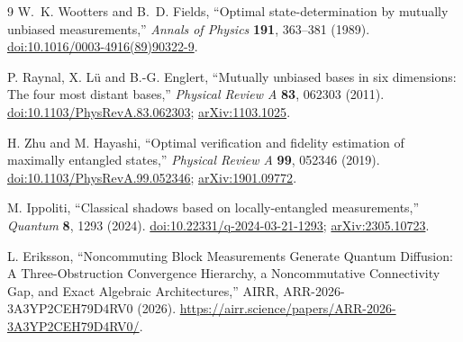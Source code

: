 \documentclass[11pt,a4paper]{article}
\theoremstyle{remark}
\begin{document}
\begin{thebibliography}{9}
W.~K. Wootters and B.~D. Fields,
``Optimal state-determination by mutually unbiased measurements,''
\emph{Annals of Physics} \textbf{191}, 363--381 (1989).
\href{https://doi.org/10.1016/0003-4916(89)90322-9}{doi:10.1016/0003-4916(89)90322-9}.

P. Raynal, X. L\"u and B.-G. Englert,
``Mutually unbiased bases in six dimensions: The four most distant bases,''
\emph{Physical Review A} \textbf{83}, 062303 (2011).
\href{https://doi.org/10.1103/PhysRevA.83.062303}{doi:10.1103/PhysRevA.83.062303};
\href{https://arxiv.org/abs/1103.1025}{arXiv:1103.1025}.

H. Zhu and M. Hayashi,
``Optimal verification and fidelity estimation of maximally entangled states,''
\emph{Physical Review A} \textbf{99}, 052346 (2019).
\href{https://doi.org/10.1103/PhysRevA.99.052346}{doi:10.1103/PhysRevA.99.052346};
\href{https://arxiv.org/abs/1901.09772}{arXiv:1901.09772}.

M. Ippoliti,
``Classical shadows based on locally-entangled measurements,''
\emph{Quantum} \textbf{8}, 1293 (2024).
\href{https://doi.org/10.22331/q-2024-03-21-1293}{doi:10.22331/q-2024-03-21-1293};
\href{https://arxiv.org/abs/2305.10723}{arXiv:2305.10723}.

L. Eriksson,
``Noncommuting Block Measurements Generate Quantum Diffusion:
A Three-Obstruction Convergence Hierarchy, a Noncommutative Connectivity Gap, and Exact Algebraic Architectures,''
AIRR, ARR-2026-3A3YP2CEH79D4RV0 (2026).
\url{https://airr.science/papers/ARR-2026-3A3YP2CEH79D4RV0/}.
\end{thebibliography}
\end{document}
